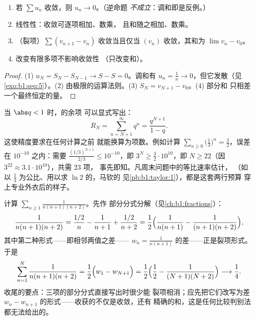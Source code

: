\begin{proposition}[基本性质]\label{prop:b1:series:first}
\begin{enumerate}
  \item 若 $\sum u_n$ 收敛，则 $u_n \to 0$。（逆命题
        \emph{不成立}：调和即是反例。）
  \item 线性性：收敛可逐项相加、数乘，
        且和随之相加、数乘。
  \item （裂项）$\sum (v_{n+1} -
        v_n)$ 收敛当且仅当 $(v_n)$ 收敛，其和为 $\lim v_n -
        v_0$。
  \item 改变有限多项不影响收敛性
        （只改变和）。
\end{enumerate}
\end{proposition}

\begin{proof}
(1) $u_N = S_N - S_{N-1} \to S - S = 0$。调和有
$u_n = \frac1n \to 0$，但它发散（见\cref{exo:b1:seq:5}）。(2)
由极限的运算法则。(3) $S_N = v_{N+1} - v_0$。(4) 部分和
只相差一个最终恒定的量。
\end{proof}

\begin{example}[用等比余项规划项数]\label{ex:b1:series:georemainder}
当 $\abs q < 1$ 时，的余项
可以显式写出：
\[
R_N = \sum_{n = N+1}^{\infty} q^n = \frac{q^{N+1}}{1 - q} .
\]
这使精度要求在任何计算之前
就能换算为项数。例如计算 $\sum_{n\geq0} \bigl(\frac13\bigr)^n =
\frac32$，误差在 $10^{-10}$ 之内：需要 $\frac{(1/3)^{N+1}}{2/3} \leq
10^{-10}$，即 $3^{N} \geq \frac{3}{2}\cdot 10^{10}$，即 $N
\geq 22$（因 $3^{22} \approx 3.1\cdot10^{10}$），共需 23 项，
事先即知。凡周末问题中的等比速率估计，
（如以 $\frac13$ 为公比、用以求 $\ln 2$ 的，马钦的
见\cref{pb:b1:taylor:1}），都是这套两行预算
穿上专业外衣后的样子。
\end{example}

\begin{example}[更长的裂项]\label{ex:b1:series:telescope3}
计算 $\sum_{n\geq1} \frac{1}{n(n+1)(n+2)}$。先作
部分分式分解（见\cref{ch:b1:fractions}）：
\[
\frac{1}{n(n+1)(n+2)}
= \frac{1/2}{n} - \frac{1}{n+1} + \frac{1/2}{n+2}
= \frac12\Bigl(\frac{1}{n(n+1)} - \frac{1}{(n+1)(n+2)}\Bigr),
\]
其中第二种形式——即相邻两值之差——
$w_n = \frac{1}{n(n+1)}$ 的差——正是裂项形式。于是
\[
\sum_{n=1}^{N} \frac{1}{n(n+1)(n+2)}
= \frac12\Bigl(w_1 - w_{N+1}\Bigr)
= \frac12\Bigl(\frac12 - \frac{1}{(N+1)(N+2)}\Bigr)
\longrightarrow \frac14 .
\]
收尾的要点：三项的部分分式直接写出时很少能
裂项相消；应先把它们改写为差 $w_n -
w_{n+1}$ 的形式——收获的不仅是收敛，还有
精确的和，这是任何比较判别法都无法给出的。
\end{example}


